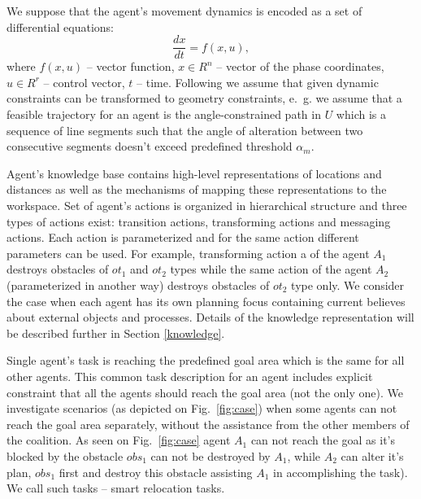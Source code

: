 \documentclass[runningheads,a4paper]{llncs}
\begin{document}
We suppose that the agent's movement dynamics is encoded as a set of differential equations:
\begin{equation}
	\frac{dx}{dt} = f(x,u),
\end{equation}
where $f(x,u)$ – vector function, $x\in R^n$ – vector of the phase coordinates, $u\in R^r$ – control vector, $t$ – time. Following \cite{Yakovlev2015a} we assume that given dynamic constraints can be transformed to geometry constraints, e.~g. we assume that a feasible trajectory for an agent is the angle-constrained path in $U$ which is a sequence of line segments such that the angle of alteration between two consecutive segments doesn't exceed predefined threshold $\alpha_m$.

Agent's knowledge base contains high-level representations of locations and distances as well as the mechanisms of mapping these representations to the workspace. Set of agent's actions is organized in hierarchical structure and three types of actions exist: transition actions, transforming actions and messaging actions. Each action is parameterized and for the same action different parameters can be used. For example, transforming action a of the agent $A_1$ destroys obstacles of $ot_1$ and $ot_2$ types while the same action of the agent $A_2$ (parameterized in another way) destroys obstacles of $ot_2$ type only. We consider the case when each agent has its own planning focus containing current believes about external objects and processes. Details of the knowledge representation will be described further in Section \ref{knowledge}.

Single agent's task is reaching the predefined goal area which is the same for all other agents. This common task description for an agent includes explicit constraint that all the agents should reach the goal area (not the only one). We investigate scenarios (as depicted on Fig.~\ref{fig:case}) when some agents can not reach the goal area separately, without the assistance from the other members of the coalition. As seen on Fig.~\ref{fig:case} agent $A_1$ can not reach the goal as it's blocked by the obstacle $obs_1$ can not be destroyed by $A_1$, while $A_2$ can alter it's plan, $obs_1$ first and destroy this obstacle assisting $A_1$ in accomplishing the task). We call such tasks – smart relocation tasks.
\end{document}
